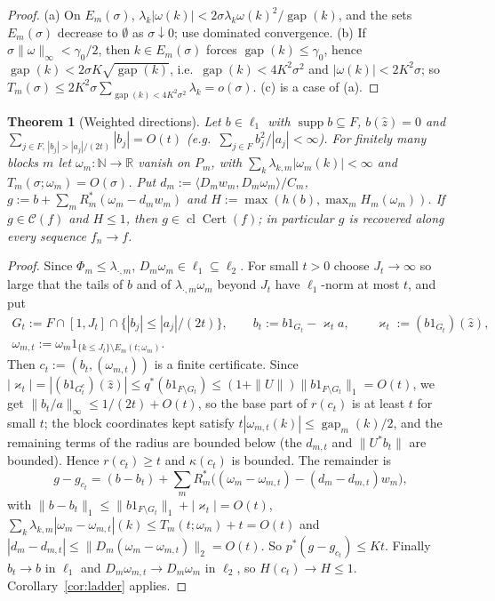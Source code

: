 \documentclass[10pt]{amsart}
\newtheorem{theorem}{Theorem}[section]
\theoremstyle{definition}
\theoremstyle{remark}
\newcommand{\supp}{\operatorname{supp}}
\newcommand{\R}{\mathbb R}
\newcommand{\N}{\mathbb N}
\newcommand{\Cset}{\mathcal C}
\newcommand{\Cert}{\operatorname{Cert}}
\newcommand{\cl}{\operatorname{cl}}
\newcommand{\gap}{\operatorname{gap}}
\newcommand{\zh}{\hat z}
\newcommand{\ip}[2]{\langle #1,#2\rangle}
\begin{document}
\begin{proof}
(a) On $E_m(\sigma)$, $\lambda_k|\omega(k)|<2\sigma\lambda_k\omega(k)^2/
\gap(k)$, and the sets $E_m(\sigma)$ decrease to $\emptyset$ as
$\sigma\downarrow0$; use dominated convergence.  (b) If
$\sigma\|\omega\|_\infty<\gamma_0/2$, then $k\in E_m(\sigma)$ forces
$\gap(k)\le\gamma_0$, hence $\gap(k)<2\sigma K\sqrt{\gap(k)}$, i.e.\
$\gap(k)<4K^2\sigma^2$ and $|\omega(k)|<2K^2\sigma$; so $T_m(\sigma)\le
2K^2\sigma\sum_{\gap(k)<4K^2\sigma^2}\lambda_k=o(\sigma)$.  (c) is a case
of (a).
\end{proof}

\begin{theorem}[Weighted directions]\label{thm:weighted}
Let $b\in\ell_1$ with $\supp b\subseteq F$, $b(\zh)=0$ and
$\sum_{j\in F,\,|b_j|>|a_j|/(2t)}|b_j|=O(t)$ \textup{(}e.g.\
$\sum_{j\in F}b_j^2/|a_j|<\infty$\textup{)}.  For finitely many blocks $m$
let $\omega_m:\N\to\R$ vanish on $P_m$, with
$\sum_k\lambda_{k,m}|\omega_m(k)|<\infty$ and $T_m(\sigma;\omega_m)=O(\sigma)$.
Put $d_m:=\ip{D_mw_m}{D_m\omega_m}/C_m$,
$g:=b+\sum_mR_m^*(\omega_m-d_mw_m)$ and $H:=\max(h(b),\max_mH_m(\omega_m))$.
If $g\in\Cset(f)$ and $H\le1$, then $g\in\cl\Cert(f)$; in particular $g$
is recovered along every sequence $f_n\to f$.
\end{theorem}

\begin{proof}
Since $\Phi_m\le\lambda_{\cdot,m}$, $D_m\omega_m\in\ell_1\subseteq\ell_2$.
For small $t>0$ choose $J_t\to\infty$ so large that the tails of $b$ and of
$\lambda_{\cdot,m}\omega_m$ beyond $J_t$ have $\ell_1$-norm at most $t$, and
put
\begin{gather*}
 G_t:=F\cap[1,J_t]\cap\{|b_j|\le|a_j|/(2t)\},\qquad
 b_t:=b1_{G_t}-\varkappa_ta,\qquad \varkappa_t:=(b1_{G_t})(\zh),\\
 \omega_{m,t}:=\omega_m1_{\{k\le J_t\}\setminus E_m(t;\omega_m)}.
\end{gather*}
Then $c_t:=(b_t,(\omega_{m,t}))$ is a finite certificate.  Since
$|\varkappa_t|=|(b1_{G_t^c})(\zh)|\le q^*(b1_{F\setminus
G_t})\le(1+\|U\|)\|b1_{F\setminus G_t}\|_1=O(t)$, we get
$\|b_t/a\|_\infty\le1/(2t)+O(t)$, so the base part of $r(c_t)$ is at least
$t$ for small $t$; the block coordinates kept satisfy
$t|\omega_{m,t}(k)|\le\gap_m(k)/2$, and the remaining terms of the radius
are bounded below (the $d_{m,t}$ and $\|U^*b_t\|$ are bounded).  Hence
$r(c_t)\ge t$ and $\kappa(c_t)$ is bounded.  The remainder is
\[
 g-g_{c_t}=(b-b_t)+\sum_mR_m^*\big((\omega_m-\omega_{m,t})-(d_m-d_{m,t})w_m
 \big),
\]
with $\|b-b_t\|_1\le\|b1_{F\setminus G_t}\|_1+|\varkappa_t|=O(t)$,
$\sum_k\lambda_{k,m}|\omega_m-\omega_{m,t}|(k)\le T_m(t;\omega_m)+t=O(t)$ and
$|d_m-d_{m,t}|\le\|D_m(\omega_m-\omega_{m,t})\|_2=O(t)$.  So
$p^*(g-g_{c_t})\le Kt$.  Finally $b_t\to b$ in $\ell_1$ and
$D_m\omega_{m,t}\to D_m\omega_m$ in $\ell_2$, so $H(c_t)\to H\le1$.
Corollary~\ref{cor:ladder} applies.
\end{proof}
\end{document}
